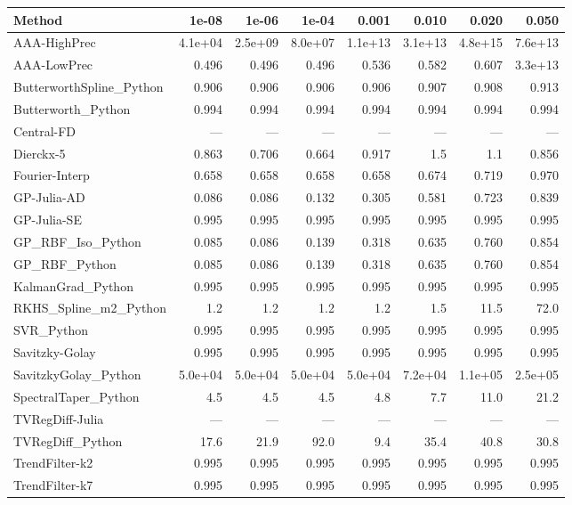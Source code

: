 \begin{longtable}{lrrrrrrr}
\toprule
\textbf{Method} & \textbf{1e-08} & \textbf{1e-06} & \textbf{1e-04} & \textbf{0.001} & \textbf{0.010} & \textbf{0.020} & \textbf{0.050} \\
\midrule
\endhead
AAA-HighPrec & 4.1e+04 & 2.5e+09 & 8.0e+07 & 1.1e+13 & 3.1e+13 & 4.8e+15 & 7.6e+13 \\
AAA-LowPrec & 0.496 & 0.496 & 0.496 & 0.536 & 0.582 & 0.607 & 3.3e+13 \\
ButterworthSpline\_Python & 0.906 & 0.906 & 0.906 & 0.906 & 0.907 & 0.908 & 0.913 \\
Butterworth\_Python & 0.994 & 0.994 & 0.994 & 0.994 & 0.994 & 0.994 & 0.994 \\
Central-FD & --- & --- & --- & --- & --- & --- & --- \\
Dierckx-5 & 0.863 & 0.706 & 0.664 & 0.917 & 1.5 & 1.1 & 0.856 \\
Fourier-Interp & 0.658 & 0.658 & 0.658 & 0.658 & 0.674 & 0.719 & 0.970 \\
GP-Julia-AD & 0.086 & 0.086 & 0.132 & 0.305 & 0.581 & 0.723 & 0.839 \\
GP-Julia-SE & 0.995 & 0.995 & 0.995 & 0.995 & 0.995 & 0.995 & 0.995 \\
GP\_RBF\_Iso\_Python & 0.085 & 0.086 & 0.139 & 0.318 & 0.635 & 0.760 & 0.854 \\
GP\_RBF\_Python & 0.085 & 0.086 & 0.139 & 0.318 & 0.635 & 0.760 & 0.854 \\
KalmanGrad\_Python & 0.995 & 0.995 & 0.995 & 0.995 & 0.995 & 0.995 & 0.995 \\
RKHS\_Spline\_m2\_Python & 1.2 & 1.2 & 1.2 & 1.2 & 1.5 & 11.5 & 72.0 \\
SVR\_Python & 0.995 & 0.995 & 0.995 & 0.995 & 0.995 & 0.995 & 0.995 \\
Savitzky-Golay & 0.995 & 0.995 & 0.995 & 0.995 & 0.995 & 0.995 & 0.995 \\
SavitzkyGolay\_Python & 5.0e+04 & 5.0e+04 & 5.0e+04 & 5.0e+04 & 7.2e+04 & 1.1e+05 & 2.5e+05 \\
SpectralTaper\_Python & 4.5 & 4.5 & 4.5 & 4.8 & 7.7 & 11.0 & 21.2 \\
TVRegDiff-Julia & --- & --- & --- & --- & --- & --- & --- \\
TVRegDiff\_Python & 17.6 & 21.9 & 92.0 & 9.4 & 35.4 & 40.8 & 30.8 \\
TrendFilter-k2 & 0.995 & 0.995 & 0.995 & 0.995 & 0.995 & 0.995 & 0.995 \\
TrendFilter-k7 & 0.995 & 0.995 & 0.995 & 0.995 & 0.995 & 0.995 & 0.995 \\

\end{longtable}
